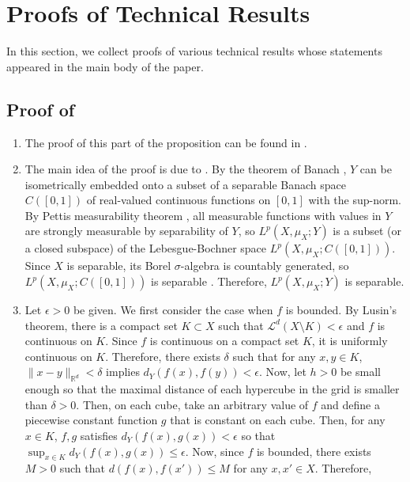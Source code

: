 \documentclass[twoside,11pt]{article}
\theoremstyle{definition}
\begin{document}
\appendix

\section{Proofs of Technical Results}\label{sec:appendix}

In this section, we collect proofs of various technical results whose statements appeared in the main body of the paper. 

\subsection{Proof of \texorpdfstring{}{Proposition \ref{prop: lp complete_separable}}}\label{app:lp complete_separable}

    \begin{enumerate}[leftmargin=*]
        \item The proof of this part of the proposition can be found in  \citet[Section 1.1]{Korevaar1993SobolevSA}. 
        \item The main idea of the proof is due to \citet{majerMO}. By the theorem of Banach \citep[Chapter XI, $\S$8, Theorem 10]{banach1987theory}, $Y$ can be isometrically embedded onto a subset of a separable Banach space $C([0,1])$ of real-valued continuous functions on $[0,1]$ with the sup-norm. By Pettis measurability theorem \citep[Theorem 1.1.6]{hytonen2016analysis}, all measurable functions with values in $Y$ are strongly measurable by separability of $Y$, so $L^p(X,\mu_X;Y)$ is a subset (or a closed subspace) of the Lebesgue-Bochner space $L^p(X,\mu_X;C([0,1]))$. Since $X$ is separable, its Borel $\sigma$-algebra is countably generated, so $L^p(X,\mu_X;C([0,1]))$ is separable \citep[Theorem 1.2.29]{hytonen2016analysis}. Therefore, $L^p(X,\mu_X;Y)$ is separable.
        \item Let $\epsilon>0$ be given. We first consider the case when $f$ is bounded. By Lusin's theorem, there is a compact set $K\subset X$ such that $\mathscr{L}^d(X\setminus K)<\epsilon$ and $f$ is continuous on $K$. Since $f$ is continuous on a compact set $K$, it is uniformly continuous on $K$. Therefore, there exists $\delta$ such that for any $x,y\in K$, $\|x-y\|_{\mathbb{R}^d}<\delta$ implies $d_Y(f(x),f(y))<\epsilon$. Now, let $h>0$ be small enough so that the maximal distance of each hypercube in the grid is smaller than $\delta>0$. Then, on each cube, take an arbitrary value of $f$ and define a piecewise constant function $g$ that is constant on each cube. Then, for any $x\in K$, $f,g$ satisfies $d_Y(f(x),g(x))<\epsilon$ so that $\sup_{x\in K}d_Y(f(x),g(x))\leq \epsilon$. Now, since $f$ is bounded, there exists $M>0$ such that $d(f(x),f(x'))\leq M$ for any $x,x'\in X$. Therefore,

\end{enumerate}
\end{document}
